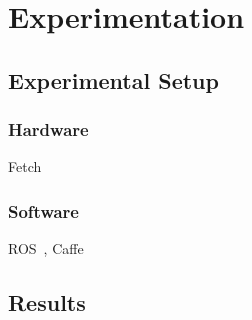 \section{\label{sec-EX}Experimentation}
  \subsection{Experimental Setup}
    \subsubsection{Hardware}
      Fetch~\cite{ackerman2015fetch}
    \subsubsection{Software}
      ROS~\cite{quigley2009ros}, Caffe~\cite{jia2014caffe}
  \subsection{Results}
